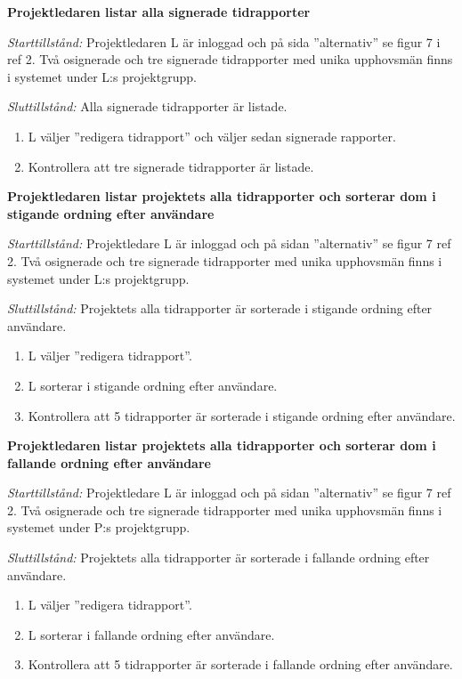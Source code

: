 \documentclass[a4paper]{article}
\begin{document}
\begin{FT}
\item %
\textbf{Projektledaren listar alla signerade tidrapporter}

\emph{Starttillstånd:} Projektledaren L är inloggad och på sida ''alternativ'' se figur 7 i ref 2. Två osignerade och tre signerade tidrapporter med unika upphovsmän finns i systemet under L:s projektgrupp.

\emph{Sluttillstånd:} Alla signerade tidrapporter är listade.                          

\begin{enumerate}
\item L väljer ''redigera tidrapport'' och väljer sedan signerade rapporter.
\item Kontrollera att tre signerade tidrapporter är listade.
\end{enumerate}

\item %
\textbf{Projektledaren listar projektets alla tidrapporter och sorterar dom i stigande ordning efter användare}

\emph{Starttillstånd:} Projektledare L är inloggad och på sidan ''alternativ'' se figur 7 ref 2. Två osignerade och tre signerade tidrapporter med unika upphovsmän finns i systemet under L:s projektgrupp.

\emph{Sluttillstånd:} Projektets alla tidrapporter är sorterade i stigande ordning efter användare.

\begin{enumerate}
\item L väljer ''redigera tidrapport''.
\item L sorterar i stigande ordning efter användare.
\item Kontrollera att 5 tidrapporter är sorterade i stigande ordning efter användare.
\end{enumerate}

\item %
\textbf{Projektledaren listar projektets alla tidrapporter och sorterar dom i fallande ordning efter användare}

\emph{Starttillstånd:} Projektledare L är inloggad och på sidan ''alternativ'' se figur 7 ref 2. Två osignerade och tre signerade tidrapporter med unika upphovsmän finns i systemet under P:s projektgrupp.

\emph{Sluttillstånd:} Projektets alla tidrapporter är sorterade i fallande ordning efter användare.

\begin{enumerate}
\item L väljer ''redigera tidrapport''.
\item L sorterar i fallande ordning efter användare.
\item Kontrollera att 5 tidrapporter är sorterade i fallande ordning efter användare.
\end{enumerate}


\end{FT}
\end{document}

